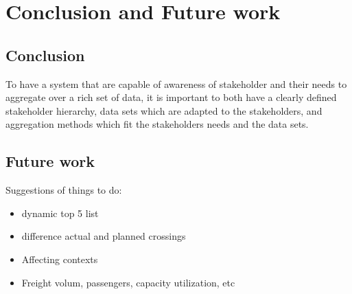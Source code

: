 \chapter{Conclusion and Future work}
\label{chapter:conclusion}

\section{Conclusion} %
\label{sec:conclusion}
To have a system that are capable of awareness of stakeholder and their needs
to aggregate over a rich set of data, it is important to both have a clearly
defined stakeholder hierarchy, data sets which are adapted to the stakeholders,
and aggregation methods which fit the stakeholders needs and the data sets. 



\section{Future work} %
\label{sec:future_work}

Suggestions of things to do:
\begin{itemize}
	\item dynamic top 5 list
	\item difference actual and planned crossings
	\item Affecting contexts
	\item Freight volum, passengers, capacity utilization, etc
\end{itemize}


